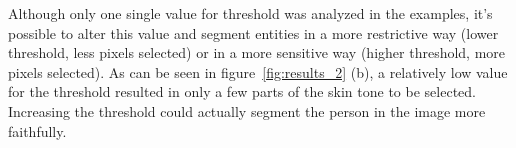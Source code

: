 \documentclass{bmvc2k}
\begin{document}
Although only one single value for threshold was analyzed in the examples, it's possible to alter this value and segment entities in a more restrictive way (lower threshold, less pixels selected) or in a more sensitive way (higher threshold, more pixels selected). As can be seen in figure~\ref{fig:results_2} (b), a relatively low value for the threshold resulted in only a few parts of the skin tone to be selected. Increasing the threshold could actually segment the person in the image more faithfully.


\end{document}
